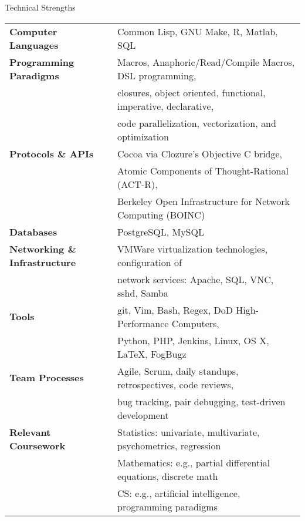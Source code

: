 

\begin{rSection}{Technical Strengths}

\begin{tabular}{ @{} >{\bfseries}l @{\hspace{4ex}} l }
Computer Languages & 		Common Lisp, GNU Make, R, Matlab, SQL \\
Programming Paradigms &		Macros, Anaphoric/Read/Compile Macros, DSL programming, \\
& 				closures, object oriented, functional, imperative, declarative, \\
&				code parallelization, vectorization, and optimization \\
Protocols \& APIs & 		Cocoa via Clozure's Objective C bridge, \\
&				Atomic Components of Thought-Rational (ACT-R), \\
&				Berkeley Open Infrastructure for Network Computing (BOINC) \\
Databases &			PostgreSQL, MySQL \\
Networking \& Infrastructure &	VMWare virtualization technologies, configuration of \\
&				network services: Apache, SQL, VNC, sshd, Samba \\
Tools & 			git, Vim, Bash, Regex, DoD High-Performance Computers, \\
&				Python, PHP, Jenkins, Linux, OS X, \LaTeX, FogBugz \\
Team Processes & 		Agile, Scrum, daily standups, retrospectives, code reviews, \\
& 				bug tracking, pair debugging, test-driven development \\
Relevant Coursework &		Statistics: univariate, multivariate, psychometrics, regression \\
&				Mathematics: e.g., partial differential equations, discrete math \\
&				CS: e.g., artificial intelligence, programming paradigms
\end{tabular}

\end{rSection}

